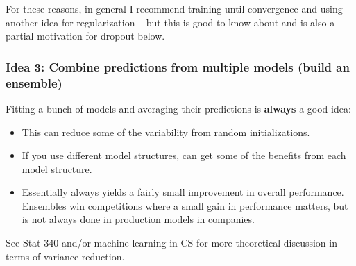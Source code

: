 \documentclass[11pt]{article}
\providecommand{\tightlist}{%
      \setlength{\itemsep}{0pt}\setlength{\parskip}{0pt}}
\begin{document}
For these reasons, in general I recommend training until convergence and
using another idea for regularization -- but this is good to know about
and is also a partial motivation for dropout below.

\newpage

    \hypertarget{idea-3-combine-predictions-from-multiple-models-build-an-ensemble}{%
\subsubsection{Idea 3: Combine predictions from multiple models (build
an
ensemble)}\label{idea-3-combine-predictions-from-multiple-models-build-an-ensemble}}

Fitting a bunch of models and averaging their predictions is
\textbf{always} a good idea:

\begin{itemize}
\tightlist
\item
  This can reduce some of the variability from random initializations.
\item
  If you use different model structures, can get some of the benefits
  from each model structure.
\item
  Essentially always yields a fairly small improvement in overall
  performance. Ensembles win competitions where a small gain in
  performance matters, but is not always done in production models in
  companies.
\end{itemize}

See Stat 340 and/or machine learning in CS for more theoretical
discussion in terms of variance reduction.
\end{document}
